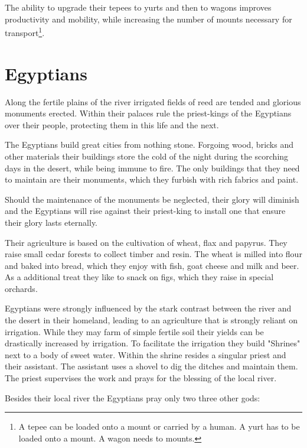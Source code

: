 \documentclass[a4paper]{article}
\begin{document}
		The ability to upgrade their tepees to yurts and then to wagons improves productivity
		and mobility, while increasing the number of mounts necessary for transport\footnote{
			A tepee can be loaded onto a mount or carried by a human.
			A yurt has to be loaded onto a mount.
			A wagon needs to mounts.
		}.

\section{\Gls{Egyptians}}

	Along the fertile plains of the river irrigated fields of reed are tended
	and glorious monuments erected.
	Within their palaces rule the priest-kings of the \gls{Egyptians} over their
	people, protecting them in this life and the next.

	The \gls{Egyptians} build great cities from nothing stone.
	Forgoing wood, bricks and other materials their buildings store the cold
	of the night during the scorching days in the desert,
	while being immune to fire.
	The only buildings that they need to maintain are their monuments,
	which they furbish with rich fabrics and paint.

	Should the maintenance of the monuments be neglected,
	their glory will diminish and the \gls{Egyptians} will rise against their
	priest-king to install one that ensure their glory lasts eternally.

	Their agriculture is based on the cultivation of wheat, flax and papyrus.
	They raise small cedar forests to collect timber and resin.
	The wheat is milled into flour and baked into bread,
		which they enjoy with fish, goat cheese and milk and beer.
	As a additional treat they like to snack on figs,
	which they raise in special orchards.

	\Gls{Egyptians} were strongly influenced by the stark contrast between
	the river and the desert in their homeland,
	leading to an agriculture that is strongly reliant on irrigation.
	While they may farm of simple fertile soil their yields can be drastically 
	increased by irrigation.
	To facilitate the irrigation they build "Shrines" next to a body of sweet water.
	Within the shrine resides a singular priest and their assistant.
	The assistant uses a shovel to dig the ditches and maintain them.
	The priest supervises the work and prays for the blessing of the local river.

	Besides their local river the \gls{Egyptians} pray only two three other gods:
\end{document}
